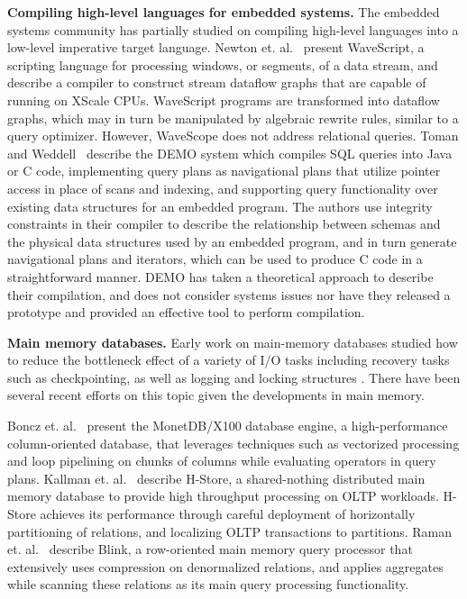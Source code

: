 \noindent \textbf{Compiling high-level languages for embedded systems.}
The embedded systems community has partially studied on compiling high-level
languages into a low-level imperative target language.
Newton et. al.~\cite{newton-lctes:08} present WaveScript, a scripting language
for processing windows, or segments, of a data stream, and describe a compiler to
construct stream dataflow graphs that are capable of running on XScale CPUs.
WaveScript programs are transformed into dataflow graphs, which may in turn be
manipulated by algebraic rewrite rules, similar to a query optimizer. However,
WaveScope does not address relational queries.
Toman and Weddell~\cite{toman-dbtel:01} describe the DEMO system which compiles
SQL queries into Java or C code, implementing query plans as navigational plans
that utilize pointer access in place of scans and indexing, and supporting query
functionality over existing data structures for an embedded program. The authors
use integrity constraints in their compiler to describe the relationship between
schemas and the physical data structures used by an embedded program, and in turn
generate navigational plans and iterators, which can be used to produce C code in
a straightforward manner. DEMO has taken a theoretical approach to describe
their compilation, and does not consider systems issues nor have they released
a prototype and provided an effective tool to perform compilation.


\noindent \textbf{Main memory databases.}
Early work on main-memory databases studied how to reduce the bottleneck effect
of a variety of I/O tasks including recovery tasks such as checkpointing, as well
as logging and locking structures \cite{bohannon-vldb:98,bohannon-sigmod:99}.
There have been several recent efforts on this topic given the developments in
main memory.

Boncz et. al.~\cite{boncz-cidr:05} present the MonetDB/X100 database engine, a
high-performance column-oriented database, that leverages techniques such as
vectorized processing and loop pipelining on chunks of columns while evaluating
operators in query plans. Kallman et. al.~\cite{kallman-pvldb:08} describe
H-Store, a shared-nothing distributed main memory database to provide high
throughput processing on OLTP workloads. H-Store achieves its performance through
careful deployment of horizontally partitioning of relations, and localizing OLTP
transactions to partitions. Raman et. al.~\cite{raman-icde:08} describe Blink, a
row-oriented main memory query processor that extensively uses compression on
denormalized relations, and applies aggregates while scanning these relations as
its main query processing functionality.

